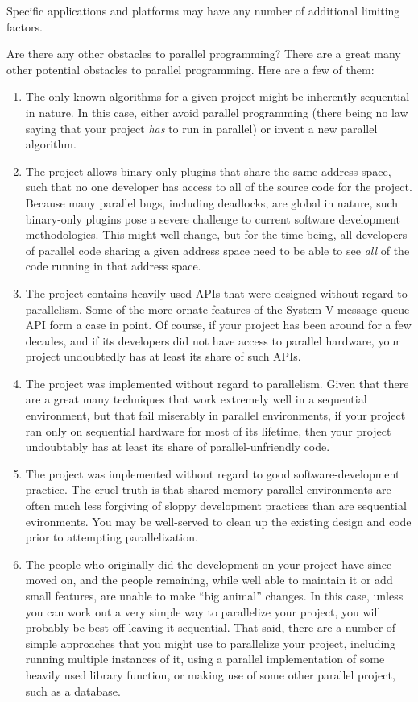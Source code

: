 	Specific applications and platforms may have any number of additional
	limiting factors.

\QuickQ{}
	Are there any other obstacles to parallel programming?
\QuickA{}
	There are a great many other potential obstacles to parallel
	programming.
	Here are a few of them:
	\begin{enumerate}
	\item	The only known algorithms for a given project might
		be inherently sequential in nature.
		In this case, either avoid parallel programming
		(there being no law saying that your project \emph{has}
		to run in parallel) or invent a new parallel algorithm.
	\item	The project allows binary-only plugins that share the same
		address space, such that no one developer has access to
		all of the source code for the project.
		Because many parallel bugs, including deadlocks, are
		global in nature, such binary-only plugins pose a severe
		challenge to current software development methodologies.
		This might well change, but for the time being, all
		developers of parallel code sharing a given address space
		need to be able to see \emph{all} of the code running in
		that address space.
	\item	The project contains heavily used APIs that were designed
		without regard to parallelism.
		Some of the more ornate features of the System V
		message-queue API form a case in point.
		Of course, if your project has been around for a few
		decades, and if its developers did not have access to
		parallel hardware, your project undoubtedly has at least
		its share of such APIs.
	\item	The project was implemented without regard to parallelism.
		Given that there are a great many techniques that work
		extremely well in a sequential environment, but that
		fail miserably in parallel environments, if your project
		ran only on sequential hardware for most of its lifetime,
		then your project undoubtably has at least its share of
		parallel-unfriendly code.
	\item	The project was implemented without regard to good
		software-development practice.
		The cruel truth is that shared-memory parallel
		environments are often much less forgiving of sloppy
		development practices than are sequential evironments.
		You may be well-served to clean up the existing design
		and code prior to attempting parallelization.
	\item	The people who originally did the development on your
		project have since moved on, and the people remaining,
		while well able to maintain it or add small features,
		are unable to make ``big animal'' changes.
		In this case, unless you can work out a very simple
		way to parallelize your project, you will probably
		be best off leaving it sequential.
		That said, there are a number of simple approaches that
		you might use
		to parallelize your project, including running multiple
		instances of it, using a parallel implementation of
		some heavily used library function, or making use of
		some other parallel project, such as a database.
	\end{enumerate}

